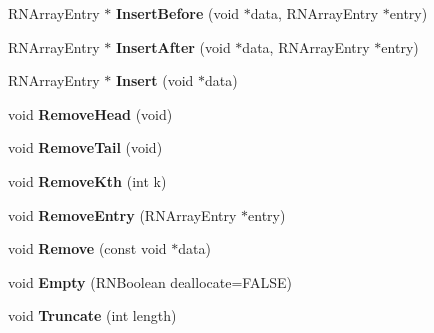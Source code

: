 \begin{DoxyCompactItemize}
\item 
R\+N\+Array\+Entry $\ast$ {\bfseries Insert\+Before} (void $\ast$data, R\+N\+Array\+Entry $\ast$entry)\hypertarget{class_r_n_v_array_ab194a56377cdbf42d0aa7596274fd4d3}{}\label{class_r_n_v_array_ab194a56377cdbf42d0aa7596274fd4d3}

\item 
R\+N\+Array\+Entry $\ast$ {\bfseries Insert\+After} (void $\ast$data, R\+N\+Array\+Entry $\ast$entry)\hypertarget{class_r_n_v_array_a7007caa59655ab0a257c6925c86c8103}{}\label{class_r_n_v_array_a7007caa59655ab0a257c6925c86c8103}

\item 
R\+N\+Array\+Entry $\ast$ {\bfseries Insert} (void $\ast$data)\hypertarget{class_r_n_v_array_aa55b91d3ad7553e1a6dd67969c80f183}{}\label{class_r_n_v_array_aa55b91d3ad7553e1a6dd67969c80f183}

\item 
void {\bfseries Remove\+Head} (void)\hypertarget{class_r_n_v_array_a9a08a514272a5c568c3c6c8cf20461ab}{}\label{class_r_n_v_array_a9a08a514272a5c568c3c6c8cf20461ab}

\item 
void {\bfseries Remove\+Tail} (void)\hypertarget{class_r_n_v_array_ac26d0420f5e7d28a145aa48ffca59414}{}\label{class_r_n_v_array_ac26d0420f5e7d28a145aa48ffca59414}

\item 
void {\bfseries Remove\+Kth} (int k)\hypertarget{class_r_n_v_array_ae1fd204c8f184f289cea0802ea80e943}{}\label{class_r_n_v_array_ae1fd204c8f184f289cea0802ea80e943}

\item 
void {\bfseries Remove\+Entry} (R\+N\+Array\+Entry $\ast$entry)\hypertarget{class_r_n_v_array_aee7bce86455bf80f5a29a737cd5ab168}{}\label{class_r_n_v_array_aee7bce86455bf80f5a29a737cd5ab168}

\item 
void {\bfseries Remove} (const void $\ast$data)\hypertarget{class_r_n_v_array_ad09797521d9bb369273c150eedfe239c}{}\label{class_r_n_v_array_ad09797521d9bb369273c150eedfe239c}

\item 
void {\bfseries Empty} (R\+N\+Boolean deallocate=F\+A\+L\+SE)\hypertarget{class_r_n_v_array_ac72d5298e6f5d2752ca1aa56ef813e76}{}\label{class_r_n_v_array_ac72d5298e6f5d2752ca1aa56ef813e76}

\item 
void {\bfseries Truncate} (int length)\hypertarget{class_r_n_v_array_afdd227a6cfd40dd190dacdc3211380bf}{}\label{class_r_n_v_array_afdd227a6cfd40dd190dacdc3211380bf}


\end{DoxyCompactItemize}
